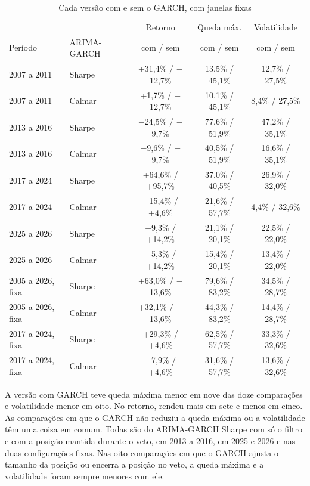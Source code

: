 \begin{table}[htbp]
\centering
\caption{Cada versão com e sem o GARCH, com janelas fixas}
\label{tab:efeito-j}
\fontsize{10}{12}\selectfont
\begin{tabular}{l|l|c|c|c}
\hline
& & Retorno & Queda máx. & Volatilidade \\
Período & ARIMA-GARCH & com / sem & com / sem & com / sem \\
\hline
2007 a 2011 & Sharpe & +31,4\% / $-$12,7\% & 13,5\% / 45,1\% & 12,7\% / 27,5\% \\
\hline
2007 a 2011 & Calmar & +1,7\% / $-$12,7\% & 10,1\% / 45,1\% & 8,4\% / 27,5\% \\
\hline
2013 a 2016 & Sharpe & $-$24,5\% / $-$9,7\% & 77,6\% / 51,9\% & 47,2\% / 35,1\% \\
\hline
2013 a 2016 & Calmar & $-$9,6\% / $-$9,7\% & 40,5\% / 51,9\% & 16,6\% / 35,1\% \\
\hline
2017 a 2024 & Sharpe & +64,6\% / +95,7\% & 37,0\% / 40,5\% & 26,9\% / 32,0\% \\
\hline
2017 a 2024 & Calmar & $-$15,4\% / +4,6\% & 21,6\% / 57,7\% & 4,4\% / 32,6\% \\
\hline
2025 a 2026 & Sharpe & +9,3\% / +14,2\% & 21,1\% / 20,1\% & 22,5\% / 22,0\% \\
\hline
2025 a 2026 & Calmar & +5,3\% / +14,2\% & 15,4\% / 20,1\% & 13,4\% / 22,0\% \\
\hline
2005 a 2026, fixa & Sharpe & +63,0\% / $-$13,6\% & 79,6\% / 83,2\% & 34,5\% / 28,7\% \\
\hline
2005 a 2026, fixa & Calmar & +32,1\% / $-$13,6\% & 44,3\% / 83,2\% & 14,4\% / 28,7\% \\
\hline
2017 a 2024, fixa & Sharpe & +29,3\% / +4,6\% & 62,5\% / 57,7\% & 33,3\% / 32,6\% \\
\hline
2017 a 2024, fixa & Calmar & +7,9\% / +4,6\% & 31,6\% / 57,7\% & 13,6\% / 32,6\% \\
\hline
\end{tabular}
\end{table}

A versão com GARCH teve queda máxima menor em nove das doze comparações e
volatilidade menor em oito. No retorno, rendeu mais em sete e menos em cinco. As
comparações em que o GARCH não reduziu a queda máxima ou a volatilidade têm uma
coisa em comum. Todas são
do ARIMA-GARCH Sharpe com só o filtro e com a posição mantida durante o veto, em
2013 a 2016, em 2025 e 2026 e nas duas configurações fixas. Nas oito comparações
em que o GARCH ajusta o tamanho da posição ou encerra a posição no veto, a queda
máxima e a volatilidade foram sempre menores com ele.

